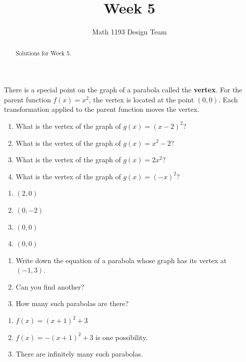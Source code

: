 \documentclass[noauthor]{ximera}
\title{Week 5}
\author{Math 1193 Design Team}
\begin{document}
\begin{abstract}
    Solutions for Week 5.
\end{abstract}
\maketitle

\begin{problem}
There is a special point on the graph of a parabola called the 
\textbf{vertex}. For the parent function \(f\left(x\right)=x^2\), 
the vertex is located at the point \((0,0)\). Each transformation 
applied to the parent function moves the vertex.

\begin{enumerate}
    \item What is the vertex of the graph of \(g(x) = (x - 2)^2\)?
    \item What is the vertex of the graph of \(g(x) = x^2 - 2\)?
    \item What is the vertex of the graph of \(g(x) = 2x^2\)?
    \item What is the vertex of the graph of \(g(x) = (-x)^2\)?
\end{enumerate}

\begin{explanation}
\begin{enumerate}
    \item \((2, 0)\)
    \item \((0, -2)\)
    \item \((0, 0)\)
    \item \((0, 0)\)
\end{enumerate}
\end{explanation}
\end{problem}

\begin{problem}
\begin{enumerate}
    \item Write down the equation of a parabola whose graph has
    its vertex at \((-1, 3)\).
    \item Can you find another?
    \item How many such parabolas are there?
\end{enumerate}

\begin{explanation}
\begin{enumerate}
    \item \(f(x) = (x + 1)^2 + 3\)
    \item \(f(x) = -(x + 1)^2 + 3\) is one possibility.
    \item There are infinitely many such parabolas.
\end{enumerate}
\end{explanation}
\end{problem}
\end{document}
